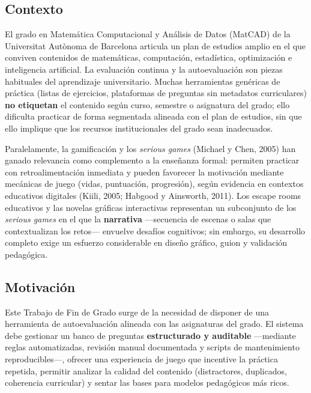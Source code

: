 \documentclass[11pt,a4paper]{article}
\begin{document}
\subsection{Contexto}

El grado en Matemática Computacional y Análisis de Datos (MatCAD) de la Universitat Autònoma de Barcelona articula un plan de estudios amplio en el que conviven contenidos de matemáticas, computación, estadística, optimización e inteligencia artificial. La evaluación continua y la autoevaluación son piezas habituales del aprendizaje universitario. Muchas herramientas genéricas de práctica (listas de ejercicios, plataformas de preguntas sin metadatos curriculares) \textbf{no etiquetan} el contenido según curso, semestre o asignatura del grado; ello dificulta practicar de forma segmentada alineada con el plan de estudios, sin que ello implique que los recursos institucionales del grado sean inadecuados.

Paralelamente, la gamificación y los \textit{serious games} (Michael y Chen, 2005) han ganado relevancia como complemento a la enseñanza formal: permiten practicar con retroalimentación inmediata y pueden favorecer la motivación mediante mecánicas de juego (vidas, puntuación, progresión), según evidencia en contextos educativos digitales (Kiili, 2005; Habgood y Ainsworth, 2011). Los escape rooms educativos y las novelas gráficas interactivas representan un subconjunto de los \textit{serious games} en el que la \textbf{narrativa} ---secuencia de escenas o salas que contextualizan los retos--- envuelve desafíos cognitivos; sin embargo, su desarrollo completo exige un esfuerzo considerable en diseño gráfico, guion y validación pedagógica.

\subsection{Motivación}

Este Trabajo de Fin de Grado surge de la necesidad de disponer de una herramienta de autoevaluación alineada con las asignaturas del grado. El sistema debe gestionar un banco de preguntas \textbf{estructurado y auditable} ---mediante reglas automatizadas, revisión manual documentada y scripts de mantenimiento reproducibles---, ofrecer una experiencia de juego que incentive la práctica repetida, permitir analizar la calidad del contenido (distractores, duplicados, coherencia curricular) y sentar las bases para modelos pedagógicos más ricos.
\end{document}
